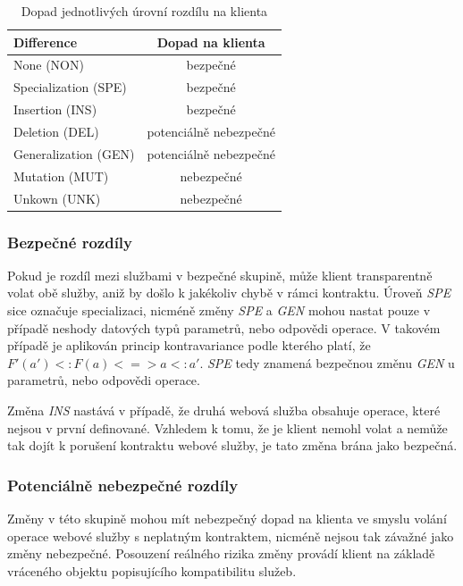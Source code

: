 \documentclass[czech,DP]{thesiskiv}
\begin{document}
\begin{table}[h!]
	\centering
	\begin{tabular}{|l|c|}
		\hline
		Difference & Dopad na klienta  \\
		\hline
		\hline
		None (NON) & bezpečné \\
		\hline
		Specialization (SPE) & bezpečné  \\
		\hline
		Insertion (INS) & bezpečné \\
		\hline
		Deletion (DEL) & potenciálně nebezpečné \\
		\hline
		Generalization (GEN) & potenciálně nebezpečné \\
		\hline
		Mutation (MUT) & nebezpečné \\
		\hline
		Unkown (UNK) & nebezpečné \\
		\hline
	\end{tabular}
	\caption{Dopad jednotlivých úrovní rozdílu na klienta }
	\label{tab:diff-level}
\end{table}

\subsubsection{Bezpečné rozdíly}

Pokud je rozdíl mezi službami v bezpečné skupině, může klient transparentně volat obě služby, aniž by došlo k jakékoliv chybě v rámci kontraktu. Úroveň \textit{SPE} sice označuje specializaci, nicméně změny \textit{SPE} a \textit{GEN} mohou nastat pouze v případě neshody datových typů parametrů, nebo odpovědi operace. V takovém případě je aplikován princip kontravariance \cite{abadi1995subytping} podle kterého platí, že $F'(a') <: F(a) <=> a <: a'$. \textit{SPE} tedy znamená bezpečnou změnu \textit{GEN} u parametrů, nebo odpovědi operace. 

Změna \textit{INS} nastává v případě, že druhá webová služba obsahuje operace, které nejsou v první definované. Vzhledem k tomu, že je klient nemohl volat a nemůže tak dojít k porušení kontraktu webové služby, je tato změna brána jako bezpečná.

\subsubsection{Potenciálně nebezpečné rozdíly}

Změny v této skupině mohou mít nebezpečný dopad na klienta ve smyslu volání operace webové služby s neplatným kontraktem, nicméně nejsou tak závažné jako změny nebezpečné. Posouzení reálného rizika změny provádí klient na základě vráceného objektu popisujícího kompatibilitu služeb.
\end{document}
